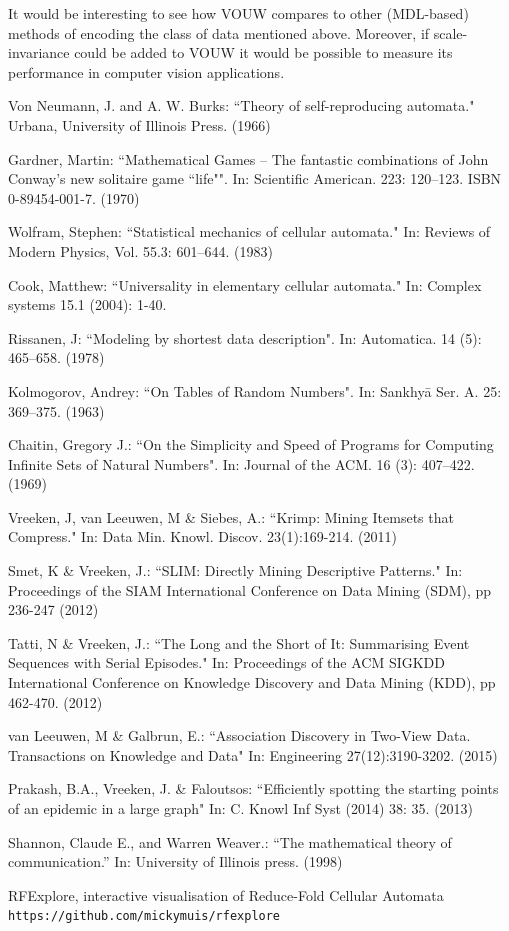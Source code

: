 \documentclass{llncs}
\begin{document}
It would be interesting to see how VOUW compares to other (MDL-based) methods of encoding the class of data mentioned above. Moreover, if scale-invariance could be added to VOUW it would be possible to measure its performance in computer vision applications.

\begin{thebibliography}{}

Von Neumann, J. and A. W. Burks:
``Theory of self-reproducing automata."
Urbana, University of Illinois Press. (1966)

Gardner, Martin:
``Mathematical Games -- The fantastic combinations of John Conway's new solitaire game ``life"". 
In: Scientific American. 223: 120–123. ISBN 0-89454-001-7.
(1970)

Wolfram, Stephen:
``Statistical mechanics of cellular automata."
In: Reviews of Modern Physics, Vol. 55.3: 601--644.
(1983)

Cook, Matthew: 
``Universality in elementary cellular automata." 
In: Complex systems 15.1 (2004): 1-40.

Rissanen, J: 
``Modeling by shortest data description". 
In: Automatica. 14 (5): 465–658.
(1978)

Kolmogorov, Andrey:
``On Tables of Random Numbers". 
In: Sankhyā Ser. A. 25: 369–375.
(1963)

Chaitin, Gregory J.: 
``On the Simplicity and Speed of Programs for Computing Infinite Sets of Natural Numbers". 
In: Journal of the ACM. 16 (3): 407–422.
(1969)

Vreeken, J, van Leeuwen, M \& Siebes, A.:
``Krimp: Mining Itemsets that Compress."
In: Data Min. Knowl. Discov. 23(1):169-214.
(2011)

Smet, K \& Vreeken, J.:
``SLIM: Directly Mining Descriptive Patterns." 
In: Proceedings of the SIAM International Conference on Data Mining (SDM), pp 236-247
(2012)

Tatti, N \& Vreeken, J.:
``The Long and the Short of It: Summarising Event Sequences with Serial Episodes."
In: Proceedings of the ACM SIGKDD International Conference on Knowledge Discovery and Data Mining (KDD), pp 462-470.
(2012)

van Leeuwen, M \& Galbrun, E.:
``Association Discovery in Two-View Data. Transactions on Knowledge and Data" In: Engineering 27(12):3190-3202.
(2015)

Prakash, B.A., Vreeken, J. \& Faloutsos: 
``Efficiently spotting the starting points of an epidemic in a large graph"
In: C. Knowl Inf Syst (2014) 38: 35.
(2013)

Shannon, Claude E., and Warren Weaver.:
``The mathematical theory of communication.''
In: University of Illinois press. (1998)

RFExplore, interactive visualisation of Reduce-Fold Cellular Automata \\
\texttt{https://github.com/mickymuis/rfexplore}

\end{thebibliography}
\end{document}
